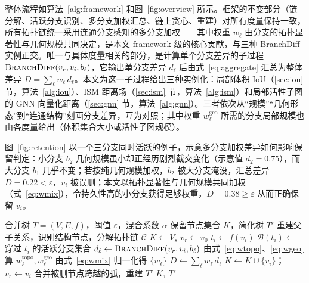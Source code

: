 \documentclass[twocolumn, a4paper, 10pt]{article}
\begin{document}
整体流程如算法~\ref{alg:framework} 和图~\ref{fig:overview} 所示。框架的不变部分（链分解、活跃分支识别、多分支加权汇总、链上贪心、重建）对所有度量保持一致，所有拓扑链统一采用连通分支感知的多分支加权——其中权重 $w_\ell$ 由分支的拓扑显著性与几何规模共同决定，是本文 framework 级的核心贡献，与三种 BranchDiff 实例正交。唯一与具体度量相关的部分，是计算单个分支差异的子过程 $\textsc{BranchDiff}(v_r,v_i,b_\ell)$，它输出单分支差异 $d_\ell$ 后由式~\eqref{eq:aggregate} 汇总为整体差异 $D=\sum_\ell w_\ell\, d_\ell$。本文为这一子过程给出三种实例化：局部体积 IoU（\ref{sec:iou} 节，算法~\ref{alg:iou}）、ISM 距离场（\ref{sec:ism} 节，算法~\ref{alg:ism}）和局部活性子图的 GNN 向量化距离（\ref{sec:gnn} 节，算法~\ref{alg:gnn}）。三者依次从“规模”“几何形态”到“连通结构”刻画分支差异，互为对照；其中权重 $w^{\mathrm{geo}}_\ell$ 所需的分支局部规模也由各度量给出（体积集合大小或活性子图规模）。

图~\ref{fig:retention} 以一个三分支同时活跃的例子，示意多分支加权差异如何影响保留判定：小分支 $b_2$ 几何规模虽小却正经历剧烈截交变化（示意值 $d_2=0.75$），而大分支 $b_1$ 几乎不变；若按纯几何规模加权，$b_2$ 被大分支淹没，汇总差异 $D=0.22<\varepsilon$，$v_i$ 被误删；本文以拓扑显著性与几何规模共同加权（式~\eqref{eq:wmix}），令持久性高的小分支获得足够权重，$D=0.38\geq\varepsilon$ 从而正确保留 $v_i$。

\begin{algorithm}[H]
\caption{连通分支感知的多分支加权简化（总体框架）}
\label{alg:framework}
\begin{algorithmic}[1]
\Require 合并树 $T=(V,E,f)$，阈值 $\varepsilon$，混合系数 $\alpha$
\Ensure 保留节点集合 $K$，简化树 $T'$
\State 重建父子关系，识别结构节点，分解拓扑链 $\mathcal{C}$
\State $K \gets V_s$ 
  \State $v_r \gets v_0$
    \State $t_i \gets f(v_i)$
    \State $\mathcal{B}(t_i) \gets$ 穿过 $t_i$ 的活跃分支集合
      \State $d_\ell \gets \textsc{BranchDiff}(v_r,v_i,b_\ell)$ 
      \State 由式~\eqref{eq:wtopo}、\eqref{eq:wgeo} 算 $w^{\mathrm{topo}}_\ell,w^{\mathrm{geo}}_\ell$
    \EndFor
    \State 由式~\eqref{eq:wmix} 归一化得 $\{w_\ell\}$
    \State $D \gets \sum_\ell w_\ell\, d_\ell$
      \State $K \gets K \cup \{v_i\}$；\quad $v_r \gets v_i$
    \EndIf
  \EndFor
\EndFor
\State 合并被删节点跨越的弧，重建 $T'$
\State \Return $K,\ T'$
\end{algorithmic}
\end{algorithm}
\end{document}
